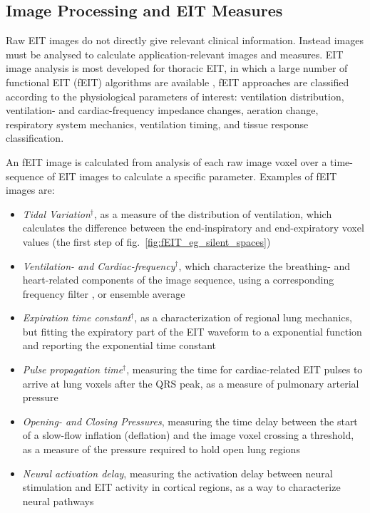\documentclass[10pt,journal]{IEEEtran}\def\TBLWIDA{15mm}\def\TBLWIDB{60mm}
\newcommand\fref[1]{fig.\ \ref{#1}}
\begin{document}
\subsection{Image Processing and EIT Measures}

Raw EIT images do not directly give relevant clinical information.
Instead images must be analysed to calculate application-relevant images
and measures. 
EIT image analysis is most developed for thoracic EIT, in which a
large number of functional EIT (fEIT) algorithms are available
\cite{Frerichs2017Chest},
fEIT approaches are classified according to the 
physiological parameters of interest: ventilation distribution,
ventilation- and cardiac-frequency impedance changes, 
aeration change, respiratory system mechanics, ventilation
timing, and tissue response classification.

An fEIT image is calculated from  analysis of each raw image voxel
over a time-sequence
of EIT images to calculate a specific parameter.
 Examples of fEIT images are:
\begin{itemize}
\item
{\em Tidal Variation}$^\dagger$, as a measure of the
distribution of ventilation, which calculates
the difference between the end-inspiratory and
end-expiratory voxel values \cite{Hahn1995Distribution}
(the first step of \fref{fig:fEIT_eg_silent_spaces})
\item
{\em Ventilation- and Cardiac-frequency}$^\dagger$, which
 characterize the breathing- and heart-related components
of the image sequence, using a corresponding frequency
filter \cite{Ferrario2012morphological}, or ensemble average 
\item
{\em Expiration time constant}$^\dagger$, as a characterization
of regional lung mechanics, but fitting the expiratory part of
the EIT waveform to a exponential function and reporting the
exponential time constant \cite{Pulletz2012Dynamics}
\item
{\em Pulse propagation time}$^\dagger$, measuring the time for cardiac-related
EIT pulses to arrive at lung voxels after the QRS peak, as a measure of pulmonary
arterial pressure \cite{Proenca2016Noninvasive} 
\item
{\em Opening- and Closing Pressures}, measuring the time delay
between the start of a slow-flow inflation (deflation) and the image voxel
crossing a threshold, as a measure of the pressure required to hold
open lung regions \cite{Pulletz2012Opening}  
\item
{\em Neural activation delay}, measuring the activation delay between
neural stimulation and EIT activity in cortical regions, as
a way to characterize neural pathways \cite{Aristovich2014Neural}
\end{itemize}
\end{document}
